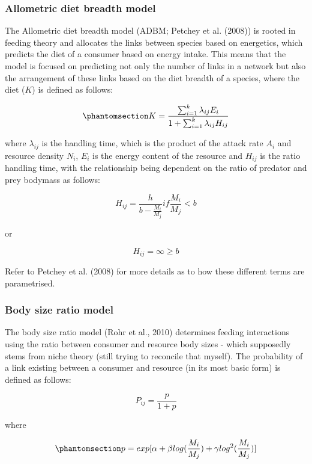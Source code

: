 \documentclass[
]{article}
\begin{document}
\subsubsection{Allometric diet breadth
model}\label{allometric-diet-breadth-model}

The Allometric diet breadth model (ADBM; Petchey et al. (2008)) is
rooted in feeding theory and allocates the links between species based
on energetics, which predicts the diet of a consumer based on energy
intake. This means that the model is focused on predicting not only the
number of links in a network but also the arrangement of these links
based on the diet breadth of a species, where the diet (\(K\)) is
defined as follows:

\begin{equation}\phantomsection\label{eq-adbm}{
K = \frac{\sum_{i=1}^{k}\lambda_{ij}E_{i}}{1+\sum_{i=1}^{k}\lambda_{ij}H_{ij}}
}\end{equation}

where \(\lambda_{ij}\) is the handling time, which is the product of the
attack rate \(A_{i}\) and resource density \(N_{i}\), \(E_{i}\) is the
energy content of the resource and \(H_{ij}\) is the ratio handling
time, with the relationship being dependent on the ratio of predator and
prey bodymass as follows:

\[
H_{ij} = \frac{h}{b - \frac{M_{i}}{M_{j}}} if \frac{M_{i}}{M_{j}} < b
\]

or

\[
H_{ij} = \infty \geq b
\]

Refer to Petchey et al. (2008) for more details as to how these
different terms are parametrised.

\subsubsection{Body size ratio model}\label{body-size-ratio-model}

The body size ratio model (Rohr et al., 2010) determines feeding
interactions using the ratio between consumer and resource body sizes -
which supposedly stems from niche theory (still trying to reconcile that
myself). The probability of a link existing between a consumer and
resource (in its most basic form) is defined as follows:

\[
P_{ij} = \frac{p}{1+p}
\]

where

\begin{equation}\phantomsection\label{eq-bodymass}{
p = exp[\alpha + \beta log(\frac{M_{i}}{M_{j}}) + \gamma log^{2}(\frac{M_{i}}{M_{j}})]
}\end{equation}
\end{document}
